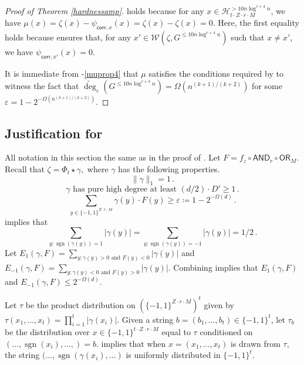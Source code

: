 \documentclass{toc}
\newcommand{\sgn}{\mathrm{sign}}
\newcommand{\OR}{\mathsf{ OR}}
\newcommand{\bits}{\{-1,1\}}
\newcommand{\ls}{\star}
\newcommand{\eps}{\varepsilon}
\newcommand{\adeg}{\widetilde{\operatorname{deg}}}
\newcommand{\AND}{\mathsf{AND}}
\renewcommand{\sgn}{\operatorname{sgn}}
\begin{document}
\begin{proof}[Proof of Theorem \ref{hardnessamp}]
	 holds because for any $x \in \mathcal{H}_{t \cdot Z \cdot r \cdot M}^{> 10 n \log^{c+4} n}$, we have $\mu(x) = \zeta(x) - \psi_{\mathsf{corr}, x}(x) = \zeta(x) - \zeta(x) = 0$. Here, the first equality holds because  ensures that, for any $x' \in \mathcal{W}\left(\zeta, G^{\leq 10 n \log^{c+4} n}\right)$ such that $x \neq x'$, we have $\psi_{\mathsf{corr}, x'}(x)=0$. 
	
	It is immediate from -\eqref{muprop4} that $\mu$ %
	satisfies the conditions 
	 required by 
	to witness the fact that $\adeg_{\eps}(G^{\leq 10 n \log^{c+4} n})  = \Omega(n^{(k+1)/(k+2)})$ for some $\eps=1-2^{-\Omega(n^{(k+1)/(k+2)})}$. 
\end{proof}

\subsection{Justification for }
\label{app:zeta2prop3}
All notation in this section the same as in the proof of .
Let $F=f_z \circ \AND_r \circ \OR_M$.
Recall that $\zeta = \Phi_t \ls \gamma,$ where $\gamma$ 
has the following properties.
\begin{equation} \|\gamma\|_1=1\,.\end{equation}
\begin{equation} \gamma
\text{ has pure high degree at least } (d/2)\cdot D' \geq 1\,.\label{equationtwotwotwo}\end{equation}
\begin{equation} \sum_{y \in \bits^{Z \cdot r \cdot M}} \gamma(y) \cdot F(y) \geq \eps \coloneqq 1-2^{-\Omega(d)}\,.\label{killmenow}\end{equation}
 implies that 
\begin{equation}
\label{lame} \sum_{y \colon \sgn(\gamma(y))=1} |\gamma(y)| = \sum_{y \colon \sgn(\gamma(y))=-1} |\gamma(y)|=1/2\,.\end{equation}
Let $E_1(\gamma, F) = \sum_{y \colon \gamma(y) > 0 \text{ and } F(y) < 0} |\gamma(y)|$ and $E_{-1}(\gamma, F) = \sum_{y \colon \gamma(y) < 0 \text{ and } F(y) > 0} |\gamma(y)|$.
Combining  
implies that $E_{1}(\gamma, F)$ and $E_{-1}(\gamma, F) \leq 2^{-\Omega(d)}$. 

Let $\tau$ be the product distribution on $\left(\bits^{Z \cdot r \cdot M}\right)^t$
given by $\tau(x_1, \dots, x_t) = \prod_{i=1}^{t} |\gamma(x_i)|$. 
Given a string $b=(b_1, \dots, b_t) \in \bits^t$, let $\tau_b$ be the distribution over $x \in \bits^{t \cdot Z \cdot r \cdot M}$
equal to $\tau$ conditioned on $(\dots, \sgn(x_i), \dots, ) = b$. 
 implies that when $x=(x_1, \dots, x_t)$ is drawn from $\tau$, the string $(\dots, \sgn(\gamma(x_i), \dots)$
is uniformly distributed in $\bits^t$. 
\end{document}
